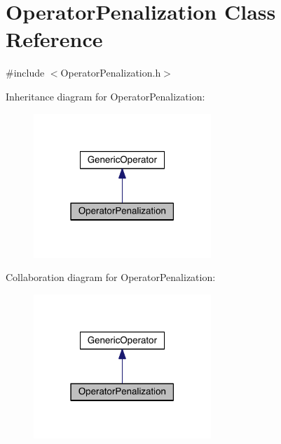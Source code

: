 \hypertarget{class_operator_penalization}{}\section{Operator\+Penalization Class Reference}
\label{class_operator_penalization}


{\ttfamily \#include $<$Operator\+Penalization.\+h$>$}



Inheritance diagram for Operator\+Penalization\+:\nopagebreak
\begin{figure}[H]
\begin{center}
\leavevmode
\includegraphics[width=190pt]{d6/da7/class_operator_penalization__inherit__graph}
\end{center}
\end{figure}


Collaboration diagram for Operator\+Penalization\+:\nopagebreak
\begin{figure}[H]
\begin{center}
\leavevmode
\includegraphics[width=190pt]{d5/d91/class_operator_penalization__coll__graph}
\end{center}
\end{figure}
